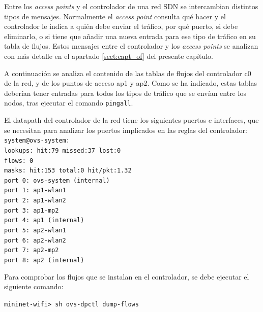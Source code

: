 \documentclass[a4paper,12pt,twoside,spanish]{book}
\begin{document}
Entre los \textit{access points} y el controlador de una red SDN se intercambian distintos tipos de mensajes. Normalmente el \textit{access point} consulta qué hacer y el controlador le indica a quién debe enviar el tráfico, por qué puerto, si debe eliminarlo, o si tiene que añadir una nueva entrada para ese tipo de tráfico en su tabla de flujos. Estos mensajes entre el controlador y los \textit{access points} se analizan con más detalle en el apartado \ref{sect:capt_of} del presente capítulo.\par 

A continuación se analiza el contenido de las tablas de flujos del controlador c0 de la red, y de los puntos de acceso ap1 y ap2. Como se ha indicado, estas tablas deberían tener entradas para todos los tipos de tráfico que se envían entre los nodos, tras ejecutar el comando \texttt{pingall}.\par 

\hspace{0.5cm}

El datapath del controlador de la red tiene los siguientes puertos e interfaces, que se necesitan para analizar los puertos implicados en las reglas del controlador:
\texttt{\\
\noindent system@ovs-system:\\
	\indent lookups: hit:79 missed:37 lost:0\\
	\indent	flows: 0\\
	\indent	masks: hit:153 total:0 hit/pkt:1.32\\
	\indent	port 0: ovs-system (internal)\\
	\indent	port 1: ap1-wlan1\\
	\indent	port 2: ap1-wlan2\\
	\indent	port 3: ap1-mp2\\
	\indent	port 4: ap1 (internal)\\
	\indent	port 5: ap2-wlan1\\
	\indent	port 6: ap2-wlan2\\
	\indent	port 7: ap2-mp2\\
	\indent	port 8: ap2 (internal)\\
}\par

Para comprobar los flujos que se instalan en el controlador, se debe ejecutar el siguiente comando:
\begin{center} 
	\texttt{mininet-wifi> sh ovs-dpctl dump-flows}
\end{center}
\end{document}
